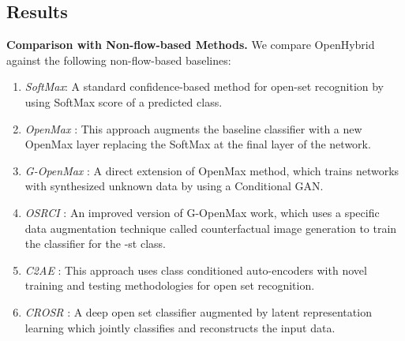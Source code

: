\documentclass[runningheads]{llncs}
\begin{document}
\subsection{Results}
\textbf{Comparison with Non-flow-based Methods.}
We compare OpenHybrid against the following non-flow-based baselines:
\begin{enumerate}
    \item {\textit{SoftMax}}: A standard confidence-based method for
    open-set recognition by using SoftMax score of a predicted class. 
    \item {\textit{OpenMax}} \cite{bendale2016towards}: This approach augments the baseline classifier with a new OpenMax layer replacing the SoftMax at the final layer of the network.
    \item {\textit{G-OpenMax}} \cite{ge2017generative}: A direct extension of OpenMax method, which trains networks with synthesized unknown data by using a Conditional GAN. 
    \item {\textit{OSRCI}} \cite{neal2018open}: An improved version of G-OpenMax work, which uses a specific data augmentation technique called counterfactual image generation to train the classifier for the -st class. 
    \item {\textit{C2AE}} \cite{oza2019c2ae}: This approach uses class conditioned auto-encoders with novel training and testing methodologies for open set recognition.
    \item {\textit{CROSR}} \cite{yoshihashi2019classification}: A deep open set classifier augmented by latent representation learning which jointly classifies and reconstructs the input data. 
\end{enumerate}
\end{document}
